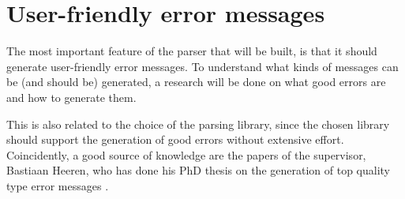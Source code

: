 
\section{User-friendly error messages}
\label{sec:errors}
The most important feature of the parser that will be built, is that it should generate user-friendly error messages.
To understand what kinds of messages can be (and should be) generated, a research will be done on what good errors are and how to generate them.

This is also related to the choice of the parsing library, since the chosen library should support the generation of good errors without extensive effort.
Coincidently, a good source of knowledge are the papers of the supervisor, Bastiaan Heeren, who has done his PhD thesis on the generation of top quality type error messages \cite{heeren-error}.
